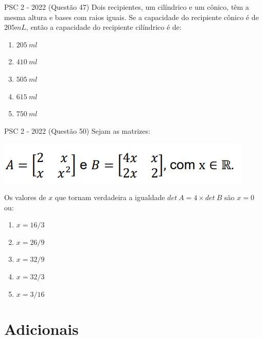 \documentclass[aspectratio=169]{beamer}
\newif\ifusarcorvermelha
\newcommand{\vermelho}[1]{%
    \ifusarcorvermelha
        {\color{red}#1}%
    \else
        #1%
    \fi
}
\begin{document}
    \begin{frame}{PSC 2 - 2022 (Questão 47)}
        Dois recipientes, um cilíndrico e um cônico, têm a mesma altura e bases com raios iguais. Se a capacidade do recipiente cônico é de $205 mL$, então a capacidade do recipiente cilíndrico é de:

        \begin{enumerate}[a]
            \item $205\ ml$
            \item $410\ ml$
            \item $505\ ml$
            \item \vermelho{$615\ ml$} %
            \item $750\ ml$

        \end{enumerate}        
    \end{frame}

    \begin{frame}{PSC 2 - 2022 (Questão 50)}
        Sejam as matrizes:

        \begin{center}
            \includegraphics[scale=0.5]{questãoPSC2022Q50.png}
        \end{center} Os valores de $x$ que tornam verdadeira a igualdade $det\  A = 4 \times det\ B$ são $x=0$ ou:

        \begin{enumerate}[a]
            \item $x={16}/{3}$
            \item $x={26}/{9}$
            \item \vermelho{$x={32}/{9}$} %
            \item $x={32}/{3}$
            \item $x={3}/{16}$

        \end{enumerate}        
    \end{frame}

    \section{Adicionais}
\end{document}
